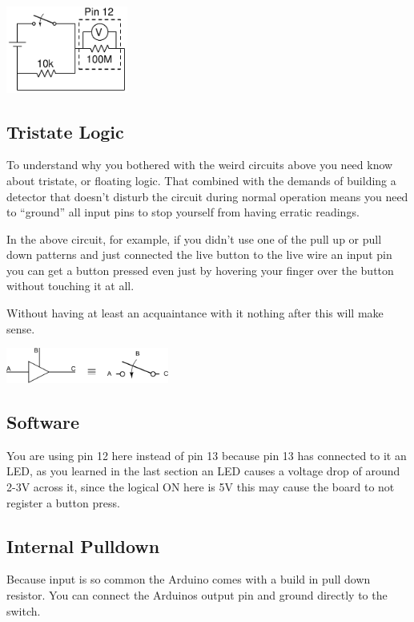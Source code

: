 \begin{center}
    \includegraphics[width=0.3\textwidth]{./Graphics/PullDownCircuit}
\end{center}

\subsection{Tristate Logic}

To understand why you bothered with the weird circuits above
you need know about tristate, or floating logic.
That combined with the demands of building a detector that doesn't disturb the 
circuit during normal operation means you need to ``ground'' all input pins
to stop yourself from having erratic readings.

In the above circuit, for example, if you didn't use one of the pull up or pull down
patterns and just connected the live button to the live wire an input pin
you can get a button pressed even just by hovering your finger over the button
without touching it at all.

Without having at least an acquaintance with it nothing after this will make sense.

\begin{center}
    \includegraphics[width=0.4\textwidth]{./Graphics/tristate}
\end{center}



\subsection{Software}


You are using pin 12 here instead of pin 13
because pin 13 has connected to it an LED,
as you learned in the last section an LED causes a voltage drop
of around 2-3V across it,
since the logical ON here is 5V 
this may cause the board to not register a button press.

\subsection{Internal Pulldown}
Because input is so common the Arduino comes with a build in
pull down resistor. 
You can connect the Arduinos output pin and ground directly to the switch.

